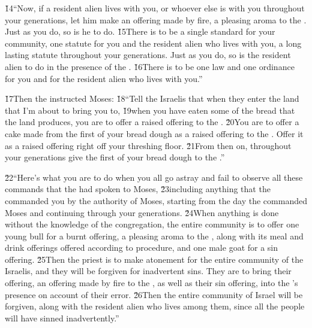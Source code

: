 \v{14}``Now, if a resident alien lives with you, or whoever else is with you throughout your generations, let him make an offering made by fire, a pleasing aroma to the . Just as you do, so is he to do. \v{15}There is to be a single standard for your community, one statute for you and the resident alien who lives with you, a long lasting statute throughout your generations. Just as you do, so is the resident alien to do in the presence of the . \v{16}There is to be one law and one ordinance for you and for the resident alien who lives with you.''

\v{17}Then the  instructed Moses: \v{18}``Tell the Israelis that when they enter the land that I'm about to bring you to, \v{19}when you have eaten some of the bread that the land produces, you are to offer a raised offering to the . \v{20}You are to offer a cake made from the first of your bread dough as a raised offering to the . Offer it as a raised offering right off your threshing floor. \v{21}From then on, throughout your generations give the first of your bread dough to the .''

\v{22}``Here's what you are to do when you all go astray and fail to observe all these commands that the  had spoken to Moses, \v{23}including anything that the  commanded you by the authority of Moses, starting from the day the  commanded Moses and continuing through your generations. \v{24}When anything is done without the knowledge of the congregation, the entire community is to offer one young bull for a burnt offering, a pleasing aroma to the , along with its meal and drink offerings offered according to procedure, and one male goat for a sin offering. \v{25}Then the priest is to make atonement for the entire community of the Israelis, and they will be forgiven for inadvertent sins. They are to bring their offering, an offering made by fire to the , as well as their sin offering, into the 's presence on account of their error. \v{26}Then the entire community of Israel will be forgiven, along with the resident alien who lives among them, since all the people will have sinned inadvertently.''

